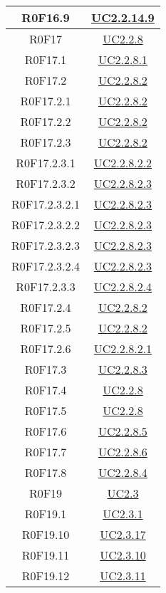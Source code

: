 \documentclass[../AnalisiDeiRequisiti.tex]{subfiles}
\begin{document}
\begin{longtable}{|c|c|}
	R0F16.9 & \hyperlink{UC2.2.14.9}{UC2.2.14.9}\\\hline
	R0F17 & \hyperlink{UC2.2.8}{UC2.2.8}\\\hline
	R0F17.1 & \hyperlink{UC2.2.8.1}{UC2.2.8.1}\\\hline
	R0F17.2 & \hyperlink{UC2.2.8.2}{UC2.2.8.2}\\\hline
	R0F17.2.1 & \hyperlink{UC2.2.8.2}{UC2.2.8.2}\\\hline
	R0F17.2.2 & \hyperlink{UC2.2.8.2}{UC2.2.8.2}\\\hline
	R0F17.2.3 & \hyperlink{UC2.2.8.2}{UC2.2.8.2}\\\hline
	R0F17.2.3.1 & \hyperlink{UC2.2.8.2.2}{UC2.2.8.2.2}\\\hline
	R0F17.2.3.2 & \hyperlink{UC2.2.8.2.3}{UC2.2.8.2.3}\\\hline
	R0F17.2.3.2.1 & \hyperlink{UC2.2.8.2.3}{UC2.2.8.2.3}\\\hline
	R0F17.2.3.2.2 & \hyperlink{UC2.2.8.2.3}{UC2.2.8.2.3}\\\hline
	R0F17.2.3.2.3 & \hyperlink{UC2.2.8.2.3}{UC2.2.8.2.3}\\\hline
	R0F17.2.3.2.4 & \hyperlink{UC2.2.8.2.3}{UC2.2.8.2.3}\\\hline
	R0F17.2.3.3 & \hyperlink{UC2.2.8.2.4}{UC2.2.8.2.4}\\\hline
	R0F17.2.4 & \hyperlink{UC2.2.8.2}{UC2.2.8.2}\\\hline
	R0F17.2.5 & \hyperlink{UC2.2.8.2}{UC2.2.8.2}\\\hline
	R0F17.2.6 & \hyperlink{UC2.2.8.2.1}{UC2.2.8.2.1}\\\hline
	R0F17.3 & \hyperlink{UC2.2.8.3}{UC2.2.8.3}\\\hline
	R0F17.4 & \hyperlink{UC2.2.8}{UC2.2.8}\\\hline
	R0F17.5 & \hyperlink{UC2.2.8}{UC2.2.8}\\\hline
	R0F17.6 & \hyperlink{UC2.2.8.5}{UC2.2.8.5}\\\hline
	R0F17.7 & \hyperlink{UC2.2.8.6}{UC2.2.8.6}\\\hline
	R0F17.8 & \hyperlink{UC2.2.8.4}{UC2.2.8.4}\\\hline
	R0F19 & \hyperlink{UC2.3}{UC2.3}\\\hline
	R0F19.1 & \hyperlink{UC2.3.1}{UC2.3.1}\\\hline
	R0F19.10 & \hyperlink{UC2.3.17}{UC2.3.17}\\\hline
	R0F19.11 & \hyperlink{UC2.3.10}{UC2.3.10}\\\hline
	R0F19.12 & \hyperlink{UC2.3.11}{UC2.3.11}\\\hline

\end{longtable}
\end{document}
